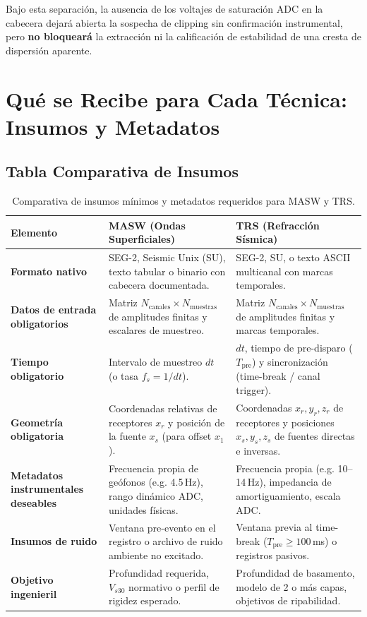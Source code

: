 \documentclass[11pt,a4paper]{article}
\begin{document}
Bajo esta separación, la ausencia de los voltajes de saturación ADC en la cabecera dejará abierta la sospecha de clipping sin confirmación instrumental, pero \textbf{no bloqueará} la extracción ni la calificación de estabilidad de una cresta de dispersión aparente.

\newpage
\section{Qué se Recibe para Cada Técnica: Insumos y Metadatos}

\subsection{Tabla Comparativa de Insumos}

\begin{table}[h!]
\centering
\small
\renewcommand{\arraystretch}{1.25}
\begin{tabularx}{\textwidth}{L{3.2cm} X X}
\toprule
\textbf{Elemento} & \textbf{MASW (Ondas Superficiales)} & \textbf{TRS (Refracción Sísmica)} \\
\midrule
\textbf{Formato nativo} & SEG-2, Seismic Unix (SU), texto tabular o binario con cabecera documentada. & SEG-2, SU, o texto ASCII multicanal con marcas temporales. \\
\addlinespace
\textbf{Datos de entrada obligatorios} & Matriz $N_{\text{canales}} \times N_{\text{muestras}}$ de amplitudes finitas y escalares de muestreo. & Matriz $N_{\text{canales}} \times N_{\text{muestras}}$ de amplitudes finitas y marcas temporales. \\
\addlinespace
\textbf{Tiempo obligatorio} & Intervalo de muestreo $dt$ (o tasa $f_s = 1/dt$). & $dt$, tiempo de pre-disparo ($T_{\text{pre}}$) y sincronización (time-break / canal trigger). \\
\addlinespace
\textbf{Geometría obligatoria} & Coordenadas relativas de receptores $x_r$ y posición de la fuente $x_s$ (para offset $x_1$). & Coordenadas $x_r, y_r, z_r$ de receptores y posiciones $x_s, y_s, z_s$ de fuentes directas e inversas. \\
\addlinespace
\textbf{Metadatos instrumentales deseables} & Frecuencia propia de geófonos (e.g. 4.5\,Hz), rango dinámico ADC, unidades físicas. & Frecuencia propia (e.g. 10--14\,Hz), impedancia de amortiguamiento, escala ADC. \\
\addlinespace
\textbf{Insumos de ruido} & Ventana pre-evento en el registro o archivo de ruido ambiente no excitado. & Ventana previa al time-break ($T_{\text{pre}} \ge 100$\,ms) o registros pasivos. \\
\addlinespace
\textbf{Objetivo ingenieril} & Profundidad requerida, $V_{s30}$ normativo o perfil de rigidez esperado. & Profundidad de basamento, modelo de 2 o más capas, objetivos de ripabilidad. \\
\bottomrule
\end{tabularx}
\caption{Comparativa de insumos mínimos y metadatos requeridos para MASW y TRS.}
\label{tab:insumos}
\end{table}
\end{document}
